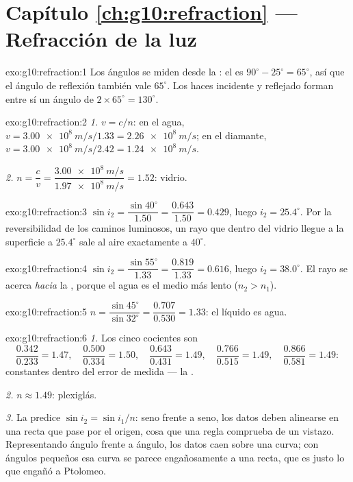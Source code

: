 \section*{Capítulo \ref{ch:g10:refraction} --- Refracción de la luz}

\begin{solution}{exo:g10:refraction:1}
Los ángulos se miden desde la : el  es
$90^\circ - 25^\circ = 65^\circ$, así que el ángulo de reflexión también
vale $65^\circ$. Los haces incidente y reflejado forman entre sí un
ángulo de $2 \times 65^\circ = 130^\circ$.
\end{solution}

\begin{solution}{exo:g10:refraction:2}
\emph{1.} $v = c/n$: en el agua,
$v = \qty{3.00e8}{m/s}/1.33 = \qty{2.26e8}{m/s}$; en el diamante,
$v = \qty{3.00e8}{m/s}/2.42 = \qty{1.24e8}{m/s}$.

\emph{2.} $n = \dfrac{c}{v} = \dfrac{\qty{3.00e8}{m/s}}
{\qty{1.97e8}{m/s}} = 1.52$: vidrio.
\end{solution}

\begin{solution}{exo:g10:refraction:3}
$\sin i_2 = \dfrac{\sin 40^\circ}{1.50} = \dfrac{0.643}{1.50} = 0.429$,
luego $i_2 = 25.4^\circ$. Por la reversibilidad de los caminos
luminosos, un rayo que dentro del vidrio llegue a la superficie a
$25.4^\circ$ sale al aire exactamente a $40^\circ$.
\end{solution}

\begin{solution}{exo:g10:refraction:4}
$\sin i_2 = \dfrac{\sin 55^\circ}{1.33} = \dfrac{0.819}{1.33} = 0.616$,
luego $i_2 = 38.0^\circ$. El rayo se acerca \emph{hacia} la ,
porque el agua es el medio más lento ($n_2 > n_1$).
\end{solution}

\begin{solution}{exo:g10:refraction:5}
$n = \dfrac{\sin 45^\circ}{\sin 32^\circ} = \dfrac{0.707}{0.530}
= 1.33$: el líquido es agua.
\end{solution}

\begin{solution}{exo:g10:refraction:6}
\emph{1.} Los cinco cocientes son
\[
\frac{0.342}{0.233} = 1.47,\quad
\frac{0.500}{0.334} = 1.50,\quad
\frac{0.643}{0.431} = 1.49,\quad
\frac{0.766}{0.515} = 1.49,\quad
\frac{0.866}{0.581} = 1.49 :
\]
constantes dentro del error de medida --- la .

\emph{2.} $n \approx 1.49$: plexiglás.

\emph{3.} La  predice $\sin i_2 = \sin i_1 / n$: seno frente
a seno, los datos deben alinearse en una recta que pase por el origen,
cosa que una regla comprueba de un vistazo. Representando ángulo frente
a ángulo, los datos caen sobre una curva; con ángulos pequeños esa curva
se parece engañosamente a una recta, que es justo lo que engañó a
Ptolomeo.
\end{solution}

